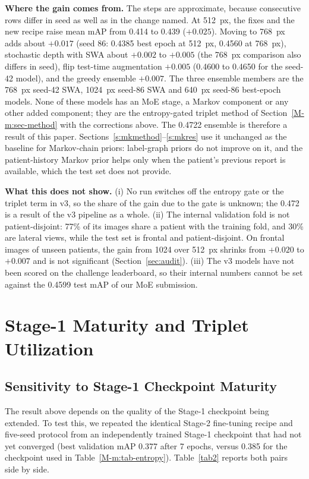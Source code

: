 \documentclass[conference]{IEEEtran}
\begin{document}
\textbf{Where the gain comes from.} The steps are approximate, because consecutive rows differ in seed as well as in the change named. At 512~px, the fixes and the new recipe raise mean mAP from 0.414 to 0.439 ($+0.025$). Moving to 768~px adds about $+0.017$ (seed 86: 0.4385 best epoch at 512~px, 0.4560 at 768~px), stochastic depth with SWA about $+0.002$ to $+0.005$ (the 768~px comparison also differs in seed), flip test-time augmentation $+0.005$ (0.4600 to 0.4650 for the seed-42 model), and the greedy ensemble $+0.007$. The three ensemble members are the 768~px seed-42 SWA, 1024~px seed-86 SWA and 640~px seed-86 best-epoch models. None of these models has an MoE stage, a Markov component or any other added component; they are the entropy-gated triplet method of Section~\ref{M-m:sec-method} with the corrections above. The 0.4722 ensemble is therefore a result of this paper. Sections~\ref{s:mkmethod}--\ref{s:mkres} use it unchanged as the baseline for Markov-chain priors: label-graph priors do not improve on it, and the patient-history Markov prior helps only when the patient's previous report is available, which the test set does not provide.

\textbf{What this does not show.} (i) No run switches off the entropy gate or the triplet term in v3, so the share of the gain due to the gate is unknown; the 0.472 is a result of the v3 pipeline as a whole. (ii) The internal validation fold is not patient-disjoint: 77\% of its images share a patient with the training fold, and 30\% are lateral views, while the test set is frontal and patient-disjoint. On frontal images of unseen patients, the gain from 1024 over 512~px shrinks from $+0.020$ to $+0.007$ and is not significant (Section~\ref{sec:audit}). (iii) The v3 models have not been scored on the challenge leaderboard, so their internal numbers cannot be set against the 0.4599 test mAP of our MoE submission.


\section{Stage-1 Maturity and Triplet Utilization}
\label{s:mat}
\subsection{Sensitivity to Stage-1 Checkpoint Maturity}
The result above depends on the quality of the Stage-1 checkpoint being extended. To test this, we repeated the identical Stage-2 fine-tuning recipe and five-seed protocol from an independently trained Stage-1 checkpoint that had not yet converged (best validation mAP 0.377 after 7 epochs, versus 0.385 for the checkpoint used in Table~\ref{M-m:tab-entropy}). Table~\ref{tab2} reports both pairs side by side.
\end{document}

